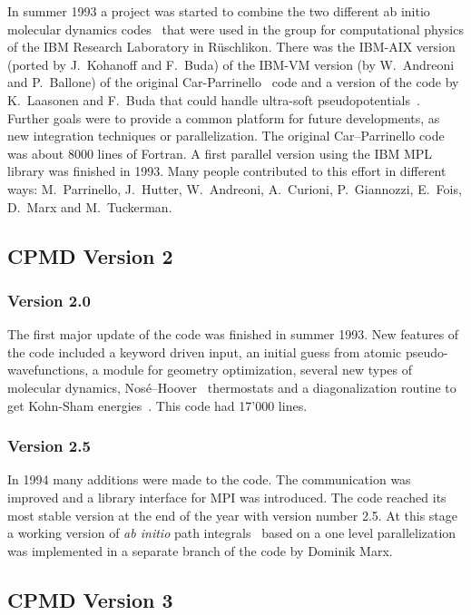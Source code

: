 \documentclass[twoside,10pt,titlepage,a4paper]{article}
\begin{document}
  In summer 1993 a project was started to combine the two different ab initio
molecular dynamics codes~\cite{Allen87} that were used in the group for computational physics
of the IBM Research Laboratory in R\"uschlikon. There was the IBM-AIX version
(ported by J.~Kohanoff and F.~Buda)  of the IBM-VM version (by W.~Andreoni and P.~Ballone) 
of the original Car-Parrinello~\cite{CP85} code and a version of the code by K.~Laasonen 
and F.~Buda that could handle ultra-soft pseudopotentials~\cite{Vanderbilt}.
Further goals were to provide a common
platform for future developments, as new integration techniques or
parallelization. The original Car--Parrinello code~\cite{CP85,Galli91} was about 8000 lines of
Fortran. A first parallel version using the IBM MPL library was finished in
1993. Many people contributed to this effort in different ways: M.~Parrinello,
J.~Hutter, W.~Andreoni, A.~Curioni, P.~Giannozzi, E.~Fois, D.~Marx and M.~Tuckerman.

\subsection{CPMD Version 2}

\subsubsection{Version 2.0}

  The first major update of the code was finished in summer 1993. New
features of the code included a keyword driven input, an initial guess from
atomic pseudo-wavefunctions, a module for geometry optimization, several new
types of molecular dynamics, Nos\'e--Hoover~\cite{Nose84,Hoover85} thermostats and a 
diagonalization routine to get Kohn-Sham energies~\cite{KS}. This code had 17'000 lines.

\subsubsection{Version 2.5}

  In 1994 many additions were made to the code. The communication was improved
and a library interface for MPI was introduced. The code reached its most
stable version at the end of the year with version number 2.5.
At this stage a working version of {\em ab initio} path integrals~\cite{Marx94,Marx96} 
based on a one level parallelization was implemented in a separate branch
of the code by Dominik Marx.

\subsection{CPMD Version 3}
\end{document}

